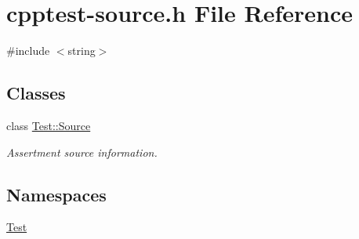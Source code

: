 \hypertarget{cpptest-source_8h}{}\section{cpptest-\/source.h File Reference}
\label{cpptest-source_8h}
{\ttfamily \#include $<$string$>$}\newline
\subsection*{Classes}
\begin{DoxyCompactItemize}
\item 
class \mbox{\hyperlink{class_test_1_1_source}{Test\+::\+Source}}
\begin{DoxyCompactList}\small\item\em Assertment source information. \end{DoxyCompactList}\end{DoxyCompactItemize}
\subsection*{Namespaces}
\begin{DoxyCompactItemize}
\item 
 \mbox{\hyperlink{namespace_test}{Test}}
\end{DoxyCompactItemize}
